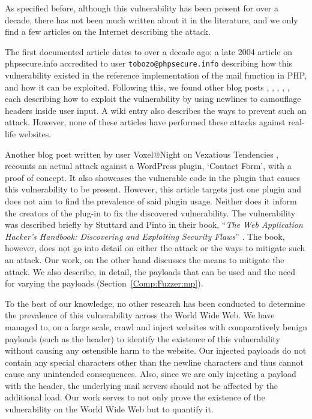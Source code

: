 As specified before, although this vulnerability has been present for over a decade, there has not been much written about it in the literature, and we only find a few articles on the Internet describing the attack.

The first documented article dates to over a decade ago; a late 2004 article on phpsecure.info \cite{Tobozo} accredited to user \texttt{tobozo@phpsecure.info} describing how this vulnerability existed in the reference implementation of the mail function in PHP, and how it can be exploited. Following this, we found other blog posts \cite{Calin}, \cite{DK}, \cite{Injection2}, \cite{Nicol}, \cite{Pope}, each describing how to exploit the vulnerability by using newlines to camouflage headers inside user input. A wiki entry \cite{Injection} also describes the ways to prevent such an attack. However, none of these articles have performed these attacks against real-life websites.

Another blog post written by user Voxel@Night on Vexatious Tendencies \cite{Tendencies2014}, recounts an actual attack against a WordPress plugin, `Contact Form', with a proof of concept\footnotemark. It also showcases the vulnerable code in the plugin that causes this vulnerability to be present. However, this article targets just one plugin and does not aim to find the prevalence of said plugin usage. Neither does it inform the creators of the plug-in to fix the discovered vulnerability.
The vulnerability was described briefly by Stuttard and Pinto in their book, ``\emph{The Web Application Hacker's Handbook: Discovering and Exploiting Security Flaws}'' \cite{stuttard2011web}. The book, however, does not go into detail on either the attack or the ways to mitigate such an attack. Our work, on the other hand discusses the means to mitigate the attack. We also describe, in detail, the payloads that can be used and the need for varying the payloads (Section~\ref{Comp:Fuzzer:mp}).

To the best of our knowledge, no other research has been conducted to determine the prevalence of this vulnerability across the World Wide Web. We have managed to, on a large scale, crawl and inject websites with comparatively benign payloads (such as the  header) to identify the existence of this vulnerability without causing any ostensible harm to the website. Our injected payloads do not contain any special characters other than the newline characters and thus cannot cause any unintended consequences. Also, since we are only injecting a payload with the  header, the underlying mail servers should not be affected by the additional load. Our work serves to not only prove the existence of the vulnerability on the World Wide Web but to quantify it.

